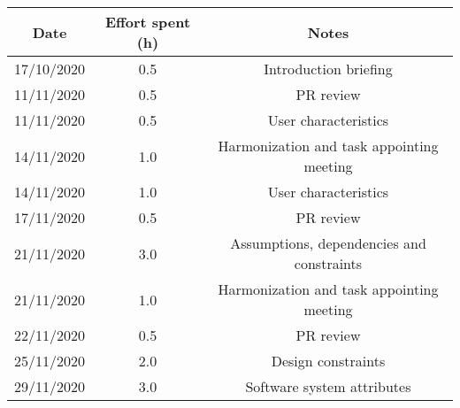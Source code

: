 \documentclass[../../main.tex]{subfiles}
\begin{document}
\begin{center}
    \begin{tabular}{|c| |c| |c|} 
        \hline
        Date & Effort spent (h) & Notes\\ [0.5ex] 
        \hline\hline
        17/10/2020 & 0.5 & Introduction briefing\\ 
        11/11/2020 & 0.5 & PR review\\
        11/11/2020 & 0.5 & User characteristics\\
        14/11/2020 & 1.0 & Harmonization and task appointing meeting\\
        14/11/2020 & 1.0 & User characteristics\\
        17/11/2020 & 0.5 & PR review\\
        21/11/2020 & 3.0 & Assumptions, dependencies and constraints\\
        21/11/2020 & 1.0 & Harmonization and task appointing meeting\\
        22/11/2020 & 0.5 & PR review\\
        25/11/2020 & 2.0 & Design constraints\\
        29/11/2020 & 3.0 & Software system attributes\\
        
        \hline
    \end{tabular}
\end{center}
\end{document}
